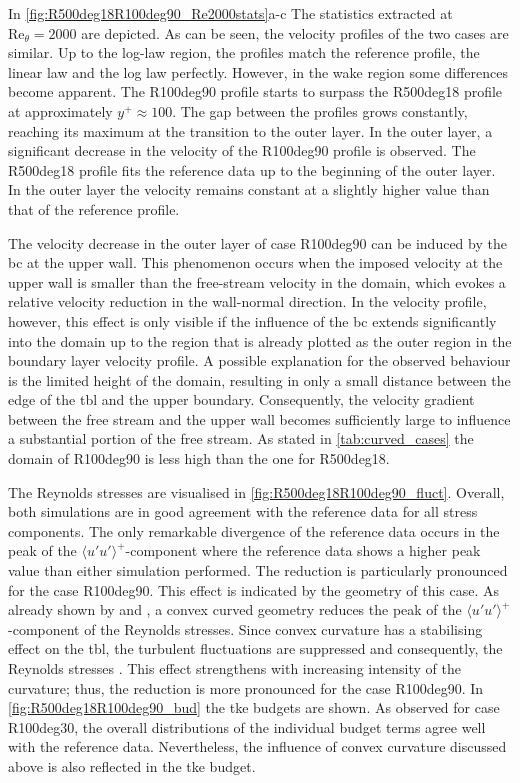 In \autoref{fig:R500deg18R100deg90_Re2000stats}a-c The statistics extracted at $\mathrm{Re}_{\theta}=2000$ are depicted.
As can be seen, the velocity profiles of the two cases are similar. 
Up to the log-law region, the profiles match the reference profile, the linear law and the log law perfectly.
However, in the wake region some differences become apparent.
The R100deg90 profile starts to surpass the R500deg18 profile at approximately $y^+ \approx 100$.
The gap between the profiles grows constantly, reaching its maximum at the transition to the outer layer.
In the outer layer, a significant decrease in the velocity of the R100deg90 profile is observed.
The  R500deg18 profile fits the reference data up to the beginning of the outer layer.
In the outer layer the velocity remains constant at a slightly higher value than that of the reference profile.



The velocity decrease in the outer layer of case R100deg90 can be induced by the \acrshort{bc} at the upper wall.
This phenomenon occurs when the imposed velocity at the upper wall is smaller than the free-stream velocity in the domain, which evokes a relative velocity reduction in the wall-normal direction.
In the velocity profile, however, this effect  is only visible if the influence of the \acrshort{bc} extends significantly into the domain up to the region that is already plotted as the outer region in the boundary layer velocity profile.
A possible explanation for the observed behaviour is the limited height of the domain, resulting in only a small distance between the edge of the \acrshort{tbl} and the upper boundary. 
Consequently, the velocity gradient between the free stream and the upper wall becomes sufficiently large to influence a substantial portion of the free stream.
As stated in \autoref{tab:curved_cases} the domain of R100deg90 is less high than the one for R500deg18.


The Reynolds stresses are visualised in  \autoref{fig:R500deg18R100deg90_fluct}.
Overall, both simulations are in good agreement with the reference data for all stress components. 
The only remarkable divergence of the reference data occurs in the peak of the $\langle u'u' \rangle^+$-component
where the reference data shows a higher peak value than either  simulation performed.
The reduction is particularly pronounced for the case R100deg90. 
This effect is indicated by the geometry of this case.
As already shown by \citet{so_experiment_1973} and \citet{schwarz_convex_1996}, a convex curved geometry reduces the peak of the $\langle u'u' \rangle^+$-component of the Reynolds stresses. 
Since convex curvature has a stabilising effect on the \acrshort{tbl}, the turbulent fluctuations are suppressed  and consequently, the Reynolds stresses \citep{yang_assessment_2016}.
This effect strengthens with increasing intensity of the curvature; thus,  the reduction is more pronounced for the case R100deg90.
In \autoref{fig:R500deg18R100deg90_bud} the \acrshort{tke} budgets are shown.
As observed for case R100deg30,  the overall distributions of the individual budget terms agree well with the reference data. 
Nevertheless, the influence of convex curvature discussed above is also reflected in the \acrshort{tke} budget.


